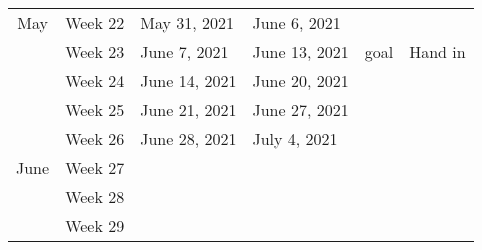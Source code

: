 \documentclass[
  a4paper,  %
  twoside,  %
  bibliography=totoc,
  headsepline,
  cleardoublepage=empty,
  parskip=half,
  draft=false
]{scrbook}
\begin{document}
\begin{table}[]
\begin{tabular}{clllcc}
\multirow{-5}{*}{May}           & Week 22      & May 31, 2021      & June 6, 2021      &                                                                                          &                                                                                                                            \\
                                & Week 23      & June 7, 2021      & June 13, 2021     & \multirow{-2}{*}{goal}                                                                   & \multirow{-2}{*}{Hand in}                                                                                                  \\
                                & Week 24      & June 14, 2021     & June 20, 2021     & \multicolumn{1}{l}{}                                                                     & \multicolumn{1}{l}{}                                                                                                       \\
                                & Week 25      & June 21, 2021     & June 27, 2021     & \multicolumn{1}{l}{}                                                                     & \multicolumn{1}{l}{}                                                                                                       \\
                                & Week 26      & June 28, 2021     & July 4, 2021      & \multicolumn{1}{l}{}                                                                     & \multicolumn{1}{l}{}                                                                                                       \\
\multirow{-5}{*}{June}          & Week 27      &                   &                   & \multicolumn{1}{l}{}                                                                     & \multicolumn{1}{l}{}                                                                                                       \\
\multicolumn{1}{l}{}            & Week 28      &                   &                   & \multicolumn{1}{l}{}                                                                     & \multicolumn{1}{l}{}                                                                                                       \\
\multicolumn{1}{l}{}            & Week 29      &                   &                   & \multicolumn{1}{l}{}                                                                     & \multicolumn{1}{l}{}                                                                                                       \\

\end{tabular}
\end{table}
\end{document}
